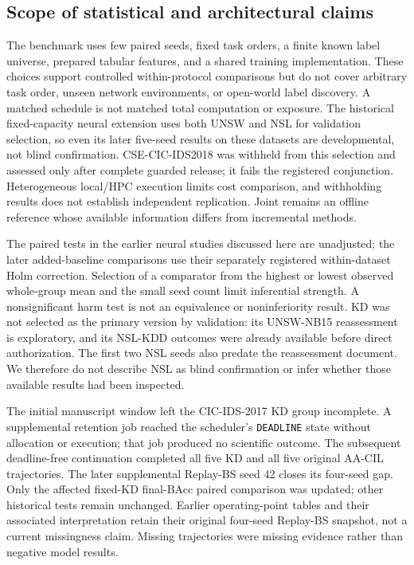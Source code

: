 \documentclass[10pt,twocolumn]{article}
\begin{document}
\subsection{Scope of statistical and architectural claims}
The benchmark uses few paired seeds, fixed task orders, a finite known label universe, prepared tabular features, and a shared training implementation. These choices support controlled within-protocol comparisons but do not cover arbitrary task order, unseen network environments, or open-world label discovery. A matched schedule is not matched total computation or exposure. The historical fixed-capacity neural extension uses both UNSW and NSL for validation selection, so even its later five-seed results on these datasets are developmental, not blind confirmation. CSE-CIC-IDS2018 was withheld from this selection and assessed only after complete guarded release; it fails the registered conjunction. Heterogeneous local/HPC execution limits cost comparison, and withholding results does not establish independent replication. Joint remains an offline reference whose available information differs from incremental methods.

The paired tests in the earlier neural studies discussed here are unadjusted; the later added-baseline comparisons use their separately registered within-dataset Holm correction. Selection of a comparator from the highest or lowest observed whole-group mean and the small seed count limit inferential strength. A nonsignificant harm test is not an equivalence or noninferiority result. KD was not selected as the primary version by validation: its UNSW-NB15 reassessment is exploratory, and its NSL-KDD outcomes were already available before direct authorization. The first two NSL seeds also predate the reassessment document. We therefore do not describe NSL as blind confirmation or infer whether those available results had been inspected.

The initial manuscript window left the CIC-IDS-2017 KD group incomplete. A supplemental retention job reached the scheduler's \texttt{DEADLINE} state without allocation or execution; that job produced no scientific outcome. The subsequent deadline-free continuation completed all five KD and all five original AA-CIL trajectories. The later supplemental Replay-BS seed 42 closes its four-seed gap. Only the affected fixed-KD final-BAcc paired comparison was updated; other historical tests remain unchanged. Earlier operating-point tables and their associated interpretation retain their original four-seed Replay-BS snapshot, not a current missingness claim. Missing trajectories were missing evidence rather than negative model results.
\end{document}
